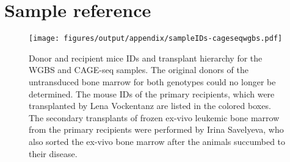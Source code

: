 \chapter{Sample reference}

\begin{figure}[!ht]
	\texttt{[image: figures/output/appendix/sampleIDs-cageseqwgbs.pdf]} 
	\caption{Donor and recipient mice IDs and transplant hierarchy for the WGBS and CAGE-seq samples. The original donors of the untransduced bone marrow for both genotypes could no longer be determined. The mouse IDs of the primary recipients, which were transplanted by Lena Vockentanz are listed in the colored boxes. The secondary transplants of frozen ex-vivo leukemic bone marrow from the primary recipients were performed by Irina Savelyeva, who also sorted the ex-vivo bone marrow after the animals succumbed to their disease.}
	\label{fig:app:sampleIDs-cageseqwgbs}
\end{figure}


